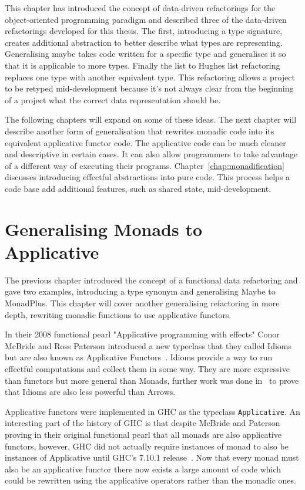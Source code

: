 This chapter has introduced the concept of data-driven refactorings for the object-oriented programming paradigm and described three of the data-driven refactorings developed for this thesis. The first, introducing a type signature, creates additional abstraction to better describe what types are representing. Generalising maybe takes code written for a specific type and generalises it so that it is applicable to more types. Finally the list to Hughes list refactoring replaces one type with another equivalent type. This refactoring allows a project to be retyped mid-development because it's not always clear from the beginning of a project what the correct data representation should be.

The following chapters will expand on some of these ideas. The next chapter will describe another form of generalisation that rewrites monadic code into its equivalent applicative functor code. The applicative code can be much cleaner and descriptive in certain cases. It can also allow programmers to take advantage of a different way of executing their programs. Chapter~\ref{chap:monadification} discusses introducing effectful abstractions into pure code. This process helps a code base add additional features, such as shared state, mid-development.


\chapter{Generalising Monads to Applicative}
\label{applicative}

The previous chapter introduced the concept of a functional data refactoring and gave two examples, introducing a type synonym and generalising Maybe to MonadPlus. This chapter will cover another generalising refactoring in more depth, rewriting monadic functions to use applicative functors. 

In their 2008 functional pearl "Applicative programming with effects" Conor McBride and Ross Paterson introduced a new typeclass that they called Idioms but are also known as Applicative Functors~\citep{mcbrideIdioms}. Idioms provide a way to run effectful computations and collect them in some way. They are more expressive than functors but more general than Monads, further work was done in~\citep{arrowsAndIdioms} to prove that Idioms are also less powerful than Arrows.

Applicative functors were implemented in GHC as the typeclass \texttt{Applicative}. An interesting part of the history of GHC is that despite McBride and Paterson proving in their original functional pearl that all monads are also applicative functors, however,  GHC did not actually require instances of monad to also be instances of Applicative until GHC's 7.10.1 release~\citep{ghc7.10Release}. Now that every monad must also be an applicative functor there now exists a large amount of code which could be rewritten using the applicative operators rather than the monadic ones. 

